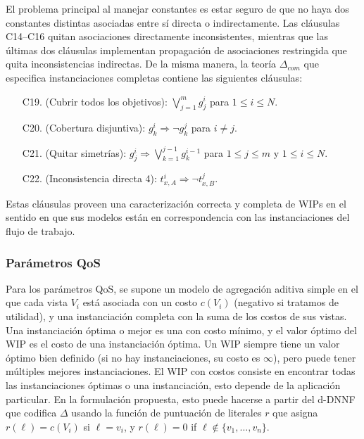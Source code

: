 El problema principal al manejar constantes es estar seguro de que no haya dos
constantes distintas asociadas entre sí directa o indirectamente. Las cláusulas
C14--C16 quitan asociaciones directamente inconsistentes, mientras que las
últimas dos cláusulas implementan propagación de asociaciones restringida que
quita inconsistencias indirectas.
De la misma manera, la teoría $\Delta_{com}$ que especifica instanciaciones
completas contiene las siguientes cláusulas:

\begin{enumerate}[C10.]
\item[C19.] (Cubrir todos los objetivos): $\bigvee_{j=1}^m g^i_j$ para $1\leq i\leq N$.
\item[C20.] (Cobertura disjuntiva): $g^i_k \Rightarrow \neg g^j_k$ para $i\neq j$.
\item[C21.] (Quitar simetrías): $g^i_j \Rightarrow \bigvee_{k=1}^{j-1} g^{i-1}_k$
            para $1\leq j\leq m$ y $1\leq i\leq N$.
\item[C22.] (Inconsistencia directa 4): $t^i_{x,A} \Rightarrow \neg t^j_{x,B}$.
\end{enumerate}

Estas cláusulas proveen una caracterización correcta y completa de WIPs en el
sentido en que sus modelos están en correspondencia con las instanciaciones del
flujo de trabajo.

\subsubsection{Parámetros QoS}

Para los parámetros QoS, se supone un modelo de agregación aditiva simple en el
que cada vista
$V_i$ está asociada con un costo $c(V_i)$ (negativo si tratamos de utilidad),
y una instanciación completa con la suma de los costos de sus vistas.
Una instanciación óptima o mejor es una con costo mínimo, y el valor óptimo del
WIP es el costo de una instanciación óptima.
Un WIP siempre tiene un valor óptimo bien definido (si no hay instanciaciones,
su costo es $\infty$), pero puede tener múltiples mejores instanciaciones.
El WIP con costos consiste en encontrar todas las instanciaciones óptimas o una
instanciación, esto depende de la aplicación particular.
En la formulación propuesta, esto puede hacerse a partir del d-DNNF que codifica
$\Delta$
usando la función de puntuación de literales $r$ que asigna
$r(\ell)=c(V_i)$ si
$\ell=v_i$, y $r(\ell)=0$ if $\ell\notin\{v_1,\ldots,v_n\}$.
